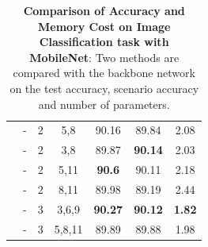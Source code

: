 \begin{table}
\begin{center}
\begin{tabular}{c||c|c|c||c|c|c}
\cline{2-7} 
& - & 2 & 5,8 & 90.16 & 89.84 & 2.08 \\ 
\cline{2-7} 
& - & 2 & 3,8 & 89.87 & \textbf{90.14} & 2.03 \\ 
\cline{2-7} 
& - & 2 & 5,11 & \textbf{90.6} & 90.11 & 2.18 \\ 
\cline{2-7} 
& - & 2 & 8,11 & 89.98 & 89.19 & 2.44 \\ 
\cline{2-7} 
& - & 3 & 3,6,9 & \textbf{90.27} & \textbf{90.12} & \textbf{1.82} \\ 
\cline{2-7} 
& - & 3 & 5,8,11 & 89.89 & 89.88 & 1.98                                                                   
\end{tabular}
\end{center}
\caption[Comparison of Accuracy and Memory Cost on Image Classification task with MobileNet]{\textbf{Comparison of Accuracy and Memory Cost on Image Classification task with MobileNet}: Two methods are compared with the backbone network on the test accuracy, scenario accuracy and number of parameters.}
\label{ic-mobilenetcifar10}
\end{table}

